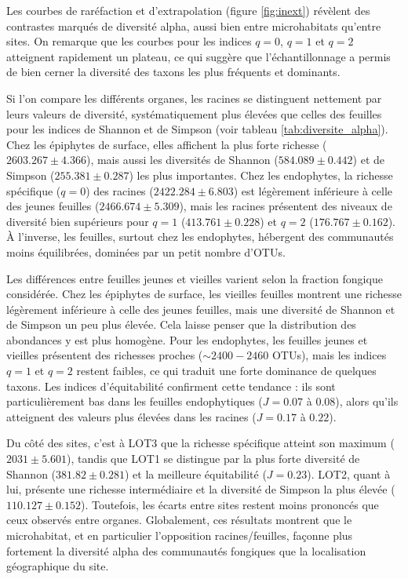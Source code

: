 \documentclass[alpha-refs,twocolumn]{wiley-article}
\begin{document}
    Les courbes de raréfaction et d’extrapolation (figure \ref{fig:inext}) révèlent des contrastes marqués de diversité alpha, aussi bien entre microhabitats qu’entre sites. On remarque que les courbes pour les indices \(q=0\), \(q=1\) et \(q=2\) atteignent rapidement un plateau, ce qui suggère que l’échantillonnage a permis de bien cerner la diversité des taxons les plus fréquents et dominants. 

    Si l’on compare les différents organes, les racines se distinguent nettement par leurs valeurs de diversité, systématiquement plus élevées que celles des feuilles pour les indices de Shannon et de Simpson (voir tableau \ref{tab:diversite_alpha}). Chez les épiphytes de surface, elles affichent la plus forte richesse (\(2603.267 \pm 4.366\)), mais aussi les diversités de Shannon (\(584.089 \pm 0.442\)) et de Simpson (\(255.381 \pm 0.287\)) les plus importantes. Chez les endophytes, la richesse spécifique (\(q=0\)) des racines (\(2422.284 \pm 6.803\)) est légèrement inférieure à celle des jeunes feuilles (\(2466.674 \pm 5.309\)), mais les racines présentent des niveaux de diversité bien supérieurs pour \(q=1\) (\(413.761 \pm 0.228\)) et \(q=2\) (\(176.767 \pm 0.162\)). À l’inverse, les feuilles, surtout chez les endophytes, hébergent des communautés moins équilibrées, dominées par un petit nombre d’OTUs.

    Les différences entre feuilles jeunes et vieilles varient selon la fraction fongique considérée. Chez les épiphytes de surface, les vieilles feuilles montrent une richesse légèrement inférieure à celle des jeunes feuilles, mais une diversité de Shannon et de Simpson un peu plus élevée. Cela laisse penser que la distribution des abondances y est plus homogène. Pour les endophytes, les feuilles jeunes et vieilles présentent des richesses proches (\(\sim 2400{-}2460\) OTUs), mais les indices \(q=1\) et \(q=2\) restent faibles, ce qui traduit une forte dominance de quelques taxons. Les indices d’équitabilité confirment cette tendance : ils sont particulièrement bas dans les feuilles endophytiques (\(J = 0.07\) à \(0.08\)), alors qu’ils atteignent des valeurs plus élevées dans les racines (\(J = 0.17\) à \(0.22\)).

    Du côté des sites, c’est à LOT3 que la richesse spécifique atteint son maximum (\(2031 \pm 5.601\)), tandis que LOT1 se distingue par la plus forte diversité de Shannon (\(381.82 \pm 0.281\)) et la meilleure équitabilité (\(J = 0.23\)). LOT2, quant à lui, présente une richesse intermédiaire et la diversité de Simpson la plus élevée (\(110.127 \pm 0.152\)). Toutefois, les écarts entre sites restent moins prononcés que ceux observés entre organes. Globalement, ces résultats montrent que le microhabitat, et en particulier l’opposition racines/feuilles, façonne plus fortement la diversité alpha des communautés fongiques que la localisation géographique du site.
\end{document}
